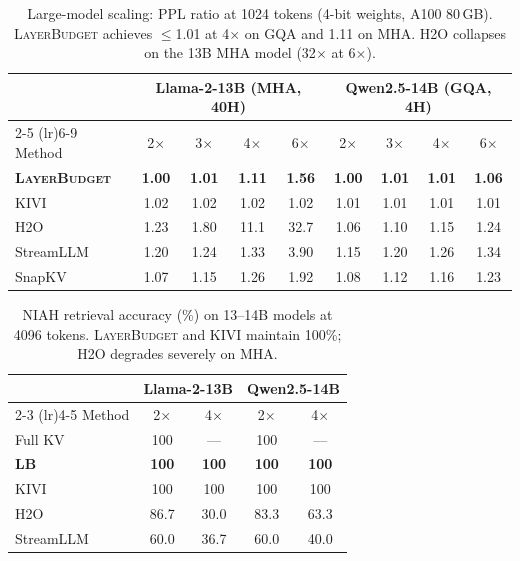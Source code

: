 \documentclass{article}
\newcommand{\layerbudget}{\textsc{LayerBudget}\xspace}
\begin{document}
\begin{table}[h]
\centering
\caption{Large-model scaling: PPL ratio at 1024 tokens (4-bit weights, A100 80\,GB).
\layerbudget achieves $\leq$1.01 at 4$\times$ on GQA and 1.11 on MHA.
H2O collapses on the 13B MHA model (32$\times$ at 6$\times$).}
\label{tab:13b}
\small
\setlength{\tabcolsep}{3pt}
\begin{tabular}{@{}lcccccccc@{}}
\toprule
& \multicolumn{4}{c}{Llama-2-13B (MHA, 40H)} & \multicolumn{4}{c}{Qwen2.5-14B (GQA, 4H)} \\
\cmidrule(lr){2-5} \cmidrule(lr){6-9}
Method & 2$\times$ & 3$\times$ & 4$\times$ & 6$\times$ & 2$\times$ & 3$\times$ & 4$\times$ & 6$\times$ \\
\midrule
\textbf{\layerbudget} & \textbf{1.00} & \textbf{1.01} & \textbf{1.11} & \textbf{1.56} & \textbf{1.00} & \textbf{1.01} & \textbf{1.01} & \textbf{1.06} \\
KIVI        & 1.02 & 1.02 & 1.02 & 1.02 & 1.01 & 1.01 & 1.01 & 1.01 \\
H2O         & 1.23 & 1.80 & 11.1 & 32.7 & 1.06 & 1.10 & 1.15 & 1.24 \\
StreamLLM   & 1.20 & 1.24 & 1.33 & 3.90 & 1.15 & 1.20 & 1.26 & 1.34 \\
SnapKV      & 1.07 & 1.15 & 1.26 & 1.92 & 1.08 & 1.12 & 1.16 & 1.23 \\
\bottomrule
\end{tabular}
\end{table}

\begin{table}[h]
\centering
\caption{NIAH retrieval accuracy (\%) on 13--14B models at 4096 tokens.
\layerbudget and KIVI maintain 100\%; H2O degrades severely on MHA.}
\label{tab:niah_large}
\small
\begin{tabular}{@{}lcccc@{}}
\toprule
& \multicolumn{2}{c}{Llama-2-13B} & \multicolumn{2}{c}{Qwen2.5-14B} \\
\cmidrule(lr){2-3} \cmidrule(lr){4-5}
Method & 2$\times$ & 4$\times$ & 2$\times$ & 4$\times$ \\
\midrule
Full KV     & 100 & --- & 100 & --- \\
\textbf{LB} & \textbf{100} & \textbf{100} & \textbf{100} & \textbf{100} \\
KIVI        & 100 & 100 & 100 & 100 \\
H2O         & 86.7 & 30.0 & 83.3 & 63.3 \\
StreamLLM   & 60.0 & 36.7 & 60.0 & 40.0 \\
\bottomrule
\end{tabular}
\end{table}
\end{document}
